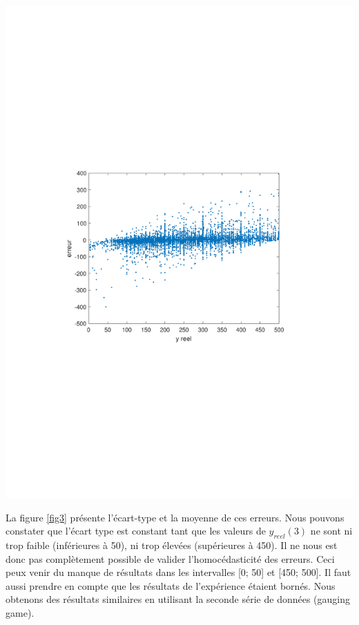 \documentclass{scrreprt}
\begin{document}
\begin{center}
\includegraphics[trim = 3cm 9cm 3cm 9cm, clip]{residu.pdf}
\label{fig2}
\end{center}

\begin{multicols}{2}

La figure \ref{fig3} présente l'écart-type et la moyenne de ces erreurs. Nous pouvons constater que l'écart type est constant tant que les valeurs de $y_{reel}(3)$ ne sont ni trop faible (inférieures à 50), ni trop élevées (supérieures à 450). Il ne nous est donc pas complètement possible de valider l'homocédasticité des erreurs. Ceci peux venir du manque de résultats dans les intervalles [0; 50] et [450; 500]. Il faut aussi prendre en compte que les résultats de l'expérience étaient bornés. Nous obtenons des résultats similaires en utilisant la seconde série de données (gauging game).\\

\end{multicols}
\end{document}
